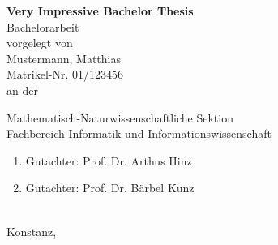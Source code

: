 
\newcommand{\MyTitle}{Very Impressive Bachelor Thesis}
\newcommand{\MyThesisType}{Bachelorarbeit}
\newcommand{\MyAuthor}{Mustermann, Matthias}
\newcommand{\MyStudentID}{01/123456}

\newcommand{\MySektion}{Mathematisch-Naturwissenschaftliche Sektion}
\newcommand{\MyDepartement}{Fachbereich Informatik und Informationswissenschaft}

\newcommand{\MyCorrectorA}{Prof. Dr. Arthus Hinz}
\newcommand{\MyCorrectorB}{Prof. Dr. B\"arbel Kunz}

\begin{titlepage}
\pagestyle{empty}
\begin{center}

{\Huge \textbf{\MyTitle}} \\[2cm]

{\Large \MyThesisType} \\[1cm]

{\Large vorgelegt von \\[.3cm]
\MyAuthor \\
Matrikel-Nr. \MyStudentID} \\[1cm]

{\Large an der}


{\Large \MySektion}\\[1cm]

{\Large \MyDepartement}\\[1cm]

{\Large
\begin{enumerate}
    \item Gutachter: \MyCorrectorA
    \item Gutachter: \MyCorrectorB
\end{enumerate}
} \ \\[1cm]

{\Large Konstanz, \the\year}

\end{center}

\cleardoublepage

\pagestyle{plain}
\setcounter{page}{1}
\end{titlepage}
